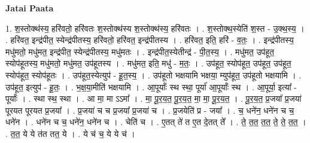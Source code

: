 \documentclass[17pt]{extarticle}
\begin{document}
\textbf{Jatai Paata} \newline

1. श॒स्तोक्थ॑स्य॒ हरि॑वतो॒ हरि॑वतः श॒स्तोक्थ॑स्य श॒स्तोक्थ॑स्य॒ हरि॑वतः । . श॒स्तोक्थ॒स्येति॑ श॒स्त - उ॒क्थ॒स्य॒ । . हरि॑वत॒ इन्द्र॑पीत॒ स्येन्द्र॑पीतस्य॒ हरि॑वतो॒ हरि॑वत॒ इन्द्र॑पीतस्य । . हरि॑वत॒ इति॒ हरि॑ - व॒तः॒ । . इन्द्र॑पीतस्य॒ मधु॑मतो॒ मधु॑मत॒ इन्द्र॑पीत॒ स्येन्द्र॑पीतस्य॒ मधु॑मतः । . इन्द्र॑पीत॒स्येतीन्द्र॑ - पी॒त॒स्य॒ । . मधु॑मत॒ उप॑हूत॒ स्योप॑हूतस्य॒ मधु॑मतो॒ मधु॑मत॒ उप॑हूतस्य । . मधु॑मत॒ इति॒ मधु॑ - म॒तः॒ । . उप॑हूत॒ स्योप॑हूत॒ उप॑हूत॒ उप॑हूत॒ स्योप॑हूत॒ स्योप॑हूतः । . उप॑हूत॒स्येत्युप॑ - हू॒त॒स्य॒ । . उप॑हूतो भक्षयामि भक्षया॒ म्युप॑हूत॒ उप॑हूतो भक्षयामि । . उप॑हूत॒ इत्युप॑ - हू॒तः॒ । . भ॒क्ष॒या॒मीति॑ भक्षयामि । . आ॒पूर्याः᳚ स्थ स्था॒ पूर्या॑ आ॒पूर्याः᳚ स्थ । . आ॒पूर्या॒ इत्या᳚ - पूर्याः᳚ । . स्था स्थ॒ स्था । . आ मा॒ मा ऽऽमा᳚ । . मा॒ पू॒र॒य॒त॒ पू॒र॒य॒त॒ मा॒ मा॒ पू॒र॒य॒त॒ । . पू॒र॒य॒त॒ प्र॒जया᳚ प्र॒जया॑ पूरयत पूरयत प्र॒जया᳚ । . प्र॒जया॑ च च प्र॒जया᳚ प्र॒जया॑ च । . प्र॒जयेति॑ प्र - जया᳚ । . च॒ धने॑न॒ धने॑न च च॒ धने॑न । . धने॑न च च॒ धने॑न॒ धने॑न च । . चेति॑ च । . ए॒तत् ते॑ त ए॒त दे॒तत् ते᳚ । . ते॒ त॒त॒ त॒त॒ ते॒ ते॒ त॒त॒ । . त॒त॒ ये ये त॑त तत॒ ये । . ये च॑ च॒ ये ये च॑ । \newline
\end{document}
